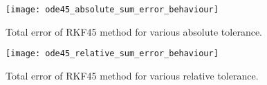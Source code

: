 \begin{figure}
    \texttt{[image: ode45\_absolute\_sum\_error\_behaviour]}
    \caption{Total error of RKF45 method for various absolute tolerance.}
    \label{fig:ode45_absolute_sum_error_behaviour}
\end{figure}

\begin{figure}
    \texttt{[image: ode45\_relative\_sum\_error\_behaviour]}
    \caption{Total error of RKF45 method for various relative tolerance.}
    \label{fig:ode45_relative_sum_error_behaviour}
\end{figure}